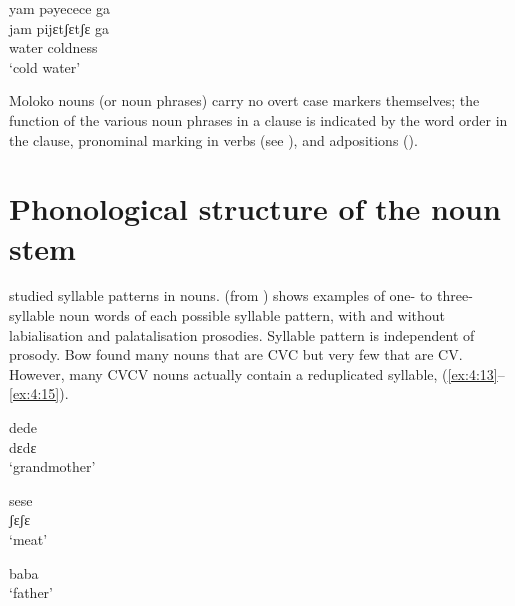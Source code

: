 \ea \label{ex:4:12}
yam  pəyecece  ga\\
\gll  jam    pijɛtʃɛtʃɛ    ga\\
      water  coldness    {\ADJ}\\
\glt  ‘cold water’
\z

Moloko nouns (or noun phrases) carry no overt case markers themselves; the function of the various noun phrases in a clause is indicated by the word order in the clause, pronominal marking in verbs (see ), and adpositions (). 

\section{Phonological structure of the noun stem}\label{sec:4.1}
\hypertarget{RefHeading1211361525720847}{}
\citet{Bow1997c} studied syllable patterns in nouns.  (from \citealt{Bow1997c}) shows examples of one- to three-syllable noun words of each possible syllable pattern, with and without labialisation and palatalisation prosodies. Syllable pattern is independent of prosody. Bow found many nouns that are CVC but very few that are CV. However, many CVCV nouns actually contain a reduplicated syllable, (\ref{ex:4:13}--\ref{ex:4:15}).

\ea \label{ex:4:13}
dede\\
  dɛdɛ\\
\glt  ‘grandmother’
\z

\ea \label{ex:4:14}
sese\\
  ʃɛʃɛ\\
\glt  ‘meat’
\z

\ea \label{ex:4:15}
baba\\
\glt  ‘father’ 
\z

